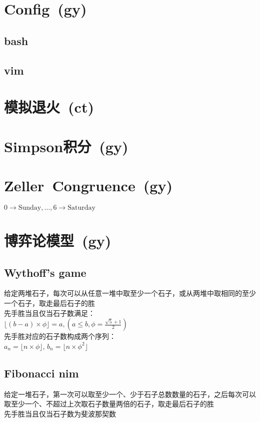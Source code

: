 \section{Config\ \small(gy)}
    \subsection*{bash}
    \subsection*{vim}
\section{模拟退火\ \small(ct)}
\section{Simpson积分\ \small(gy)}
\section{Zeller\ Congruence\ \small(gy)}
    $ 0 \to \text{Sunday} , \dots , 6 \to \text{Saturday} $
\section{博弈论模型\ \small(gy)}
    \subsection*{Wythoff's game}
        给定两堆石子，每次可以从任意一堆中取至少一个石子，或从两堆中取相同的至少一个石子，取走最后石子的胜
        \\先手胜当且仅当石子数满足：
        \\$\lfloor (b - a) \times \phi \rfloor=a, (a \leq b, \phi = \frac{\sqrt{5} + 1}{2})$
        \\先手胜对应的石子数构成两个序列：
        \\$a_n = \lfloor n \times \phi \rfloor$, $b_n = \lfloor n \times \phi ^ 2 \rfloor$
    \subsection*{Fibonacci nim}
        给定一堆石子，第一次可以取至少一个、少于石子总数数量的石子，之后每次可以取至少一个、不超过上次取石子数量两倍的石子，取走最后石子的胜
        \\先手胜当且仅当石子数为斐波那契数

